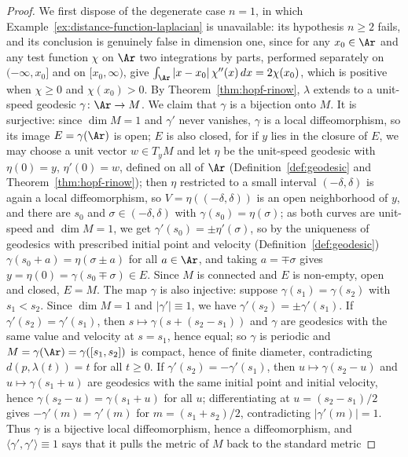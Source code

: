 \begin{proof}
We first dispose of the degenerate case $n=1$, in which
Example~\ref{ex:distance-function-laplacian} is unavailable: its
hypothesis $n\ge2$ fails, and its conclusion is genuinely false in
dimension one, since for any $x_0\in\Ar$ and any test function
$\chi$ on $\Ar$ two
integrations by parts, performed separately on $(-\infty,x_0]$ and
on $[x_0,\infty)$, give
$\int_{\Ar}|x-x_0|\,\chi''(x)\,dx=2\chi(x_0)$, which is positive
when $\chi\ge0$ and $\chi(x_0)>0$.
By Theorem~\ref{thm:hopf-rinow}, $\lambda$
extends to a unit-speed geodesic $\gamma\colon\Ar\to M$. We claim
that $\gamma$ is a bijection onto $M$. It is surjective: since
$\dim M=1$ and $\gamma'$ never vanishes, $\gamma$ is a local
diffeomorphism, so its image $E=\gamma(\Ar)$ is open; $E$ is also
closed, for if $y$ lies in the closure of $E$, we may choose a unit
vector $w\in T_yM$ and let $\eta$ be the unit-speed geodesic with
$\eta(0)=y$, $\eta'(0)=w$, defined on all of $\Ar$
(Definition~\ref{def:geodesic} and Theorem~\ref{thm:hopf-rinow});
then $\eta$ restricted to a small interval $(-\delta,\delta)$ is
again a local diffeomorphism, so $V=\eta((-\delta,\delta))$ is an
open neighborhood of $y$, and there are $s_0$ and
$\sigma\in(-\delta,\delta)$ with $\gamma(s_0)=\eta(\sigma)$; as
both curves are unit-speed and $\dim M=1$, we get
$\gamma'(s_0)=\pm\eta'(\sigma)$, so by the uniqueness of geodesics
with prescribed initial point and velocity
(Definition~\ref{def:geodesic}) $\gamma(s_0+a)=\eta(\sigma\pm a)$
for all $a\in\Ar$, and taking $a=\mp\sigma$ gives
$y=\eta(0)=\gamma(s_0\mp\sigma)\in E$. Since $M$ is connected and
$E$ is non-empty, open and closed, $E=M$. The map $\gamma$ is also
injective: suppose
$\gamma(s_1)=\gamma(s_2)$ with $s_1<s_2$. Since $\dim M=1$ and
$|\gamma'|\equiv1$, we have $\gamma'(s_2)=\pm\gamma'(s_1)$. If
$\gamma'(s_2)=\gamma'(s_1)$, then $s\mapsto\gamma(s+(s_2-s_1))$ and
$\gamma$ are geodesics with the same value and velocity at $s=s_1$,
hence equal; so $\gamma$ is periodic and
$M=\gamma(\Ar)=\gamma([s_1,s_2])$ is compact, hence of finite
diameter, contradicting $d(p,\lambda(t))=t$ for all $t\ge0$. If $\gamma'(s_2)=-\gamma'(s_1)$, then
$u\mapsto\gamma(s_2-u)$ and $u\mapsto\gamma(s_1+u)$ are geodesics
with the same initial point and initial velocity, hence
$\gamma(s_2-u)=\gamma(s_1+u)$ for all $u$; differentiating at
$u=(s_2-s_1)/2$ gives $-\gamma'(m)=\gamma'(m)$ for
$m=(s_1+s_2)/2$, contradicting $|\gamma'(m)|=1$. Thus $\gamma$ is a
bijective local diffeomorphism, hence a
diffeomorphism, and $\langle\gamma',\gamma'\rangle\equiv1$ says
that it pulls the metric of $M$ back to the standard metric

\end{proof}
